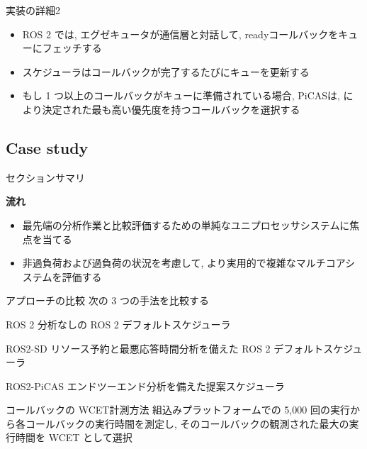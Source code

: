 \begin{frame}{実装の詳細2}
    \begin{itemize}
        \item ROS 2 では, エグゼキュータが通信層と対話して, readyコールバックをキューにフェッチする
        \item スケジューラはコールバックが完了するたびにキューを更新する
        \item もし 1 つ以上のコールバックがキューに準備されている場合, PiCASは,  により決定された最も高い優先度を持つコールバックを選択する
    \end{itemize}
\end{frame}


\subsection{Case study}
\label{ssec: case study}

\begin{frame}{セクションサマリ}
    \begin{itembox}[l]{\textbf{流れ}}
        \begin{itemize}
            \item 最先端の分析作業と比較評価するための単純なユニプロセッサシステムに焦点を当てる
            \item 非過負荷および過負荷の状況を考慮して, より実用的で複雑なマルチコアシステムを評価する
        \end{itemize}
    \end{itembox}
\end{frame}

\begin{frame}{アプローチの比較}
    次の 3 つの手法を比較する
    \begin{block}{ROS 2}
        分析なしの ROS 2 デフォルトスケジューラ
    \end{block}
    \begin{block}{ROS2-SD}
        リソース予約と最悪応答時間分析を備えた ROS 2 デフォルトスケジューラ~\cite{casini2019response}
    \end{block}
    \begin{block}{ROS2-PiCAS}
        エンドツーエンド分析を備えた提案スケジューラ
    \end{block}
\end{frame}

\begin{frame}{コールバックの WCET計測方法}
    組込みプラットフォームでの 5,000 回の実行から各コールバックの実行時間を測定し, そのコールバックの観測された最大の実行時間を WCET として選択
\end{frame}

